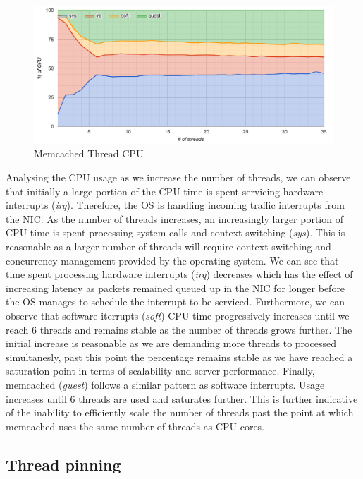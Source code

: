 \begin{figure}[htbp]
\centering
\includegraphics{./res/5_threads_cpu.png}
\caption{Memcached Thread CPU}
\end{figure}

Analysing the CPU usage as we increase the number of threads, we can
observe that initially a large portion of the CPU time is spent
servicing hardware interrupts (\emph{irq}). Therefore, the OS is
handling incoming traffic interrupts from the NIC. As the number of
threads increases, an increasingly larger portion of CPU time is spent
processing system calls and context switching (\emph{sys}). This is
reasonable as a larger number of threads will require context switching
and concurrency management provided by the operating system. We can see
that time spent processing hardware interrupts (\emph{irq}) decreases
which has the effect of increasing latency as packets remained queued up
in the NIC for longer before the OS manages to schedule the interrupt to
be serviced. Furthermore, we can observe that software iterrupts
(\emph{soft}) CPU time progressively increases until we reach 6 threads
and remains stable as the number of threads grows further. The initial
increase is reasonable as we are demanding more threads to processed
simultanesly, past this point the percentage remains stable as we have
reached a saturation point in terms of scalability and server
performance. Finally, memcached (\emph{guest}) follows a similar pattern
as software interrupts. Usage increases until 6 threads are used and
saturates further. This is further indicative of the inability to
efficiently scale the number of threads past the point at which
memcached uses the same number of threads as CPU cores.

\subsection{Thread pinning}\label{thread-pinning}

